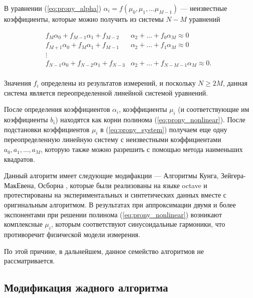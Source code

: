 В уравнении (\ref{eq:prony_alpha})  $\alpha_i = f (\mu_0, \mu_1, ... \mu_{M-1} )$  
--- неизвестные коэффициенты, которые можно получить из системы $ N - M $ уравнений

\begin{equation}
  \begin{split}
  f_M \alpha_0 + f_{M-1} \alpha_1 + f_{M-2} & \alpha_2 + \ldots + f_0 \alpha_M \approx 0  \\
  f_{M+1} \alpha_0 + f_{M} \alpha_1 + f_{M-1} & \alpha_2 + \ldots + f_1 \alpha_M \approx 0 \\
  \vdots & \\
  f_{N-1} \alpha_0 + f_{N-2} \alpha_1 + f_{N-3} & \alpha_2 + \ldots + f_{N-M-1} \alpha_M \approx 0.  \\
  \end{split}
  \label{eq:prony_system2}
\end{equation}

Значения $f_i$ определены из результатов измерений, и поскольку $N \geq 2M$, данная система является переопределенной линейной системой уравнений.

После определения коэффициентов $\alpha_i$, коэффициенты $\mu_i$ (и соответствующие им коэффициенты $b_i$) находятся
 как корни полинома (\ref{eq:prony_nonlinear}). После подстановки коэффициентов $\mu_i$ в (\ref{eq:prony_system}) получаем еще одну переопределенную линейную систему с неизвестными коэффициентами $a_0, a_1, \ldots, a_M$, которую
 также можно разрешить с помощью метода наименьших квадратов.  


Данный алгоритм имеет следующие модифакции --- Алгоритмы Кунга, Зейгера-МакЕвена, Осборна \cite{kung, zeiger, osborn}, которые были реализованы на языке octave и протестированы на экспериментальных и синтетических данных вместе с оригинальным алгоритмом. В результатах при аппроксимации двумя и более экспонентами при решении полинома (\ref{eq:prony_nonlinear}) возникают комплексные $\mu_i$, которым соответствуют синусоидальные гармоники, что противоречит физической модели измерения. 

По этой причине, в дальнейшем, данное семейство алгоритмов не рассматривается.




\subsection{Модификация жадного алгоритма}\label{subsect2_3_4}

